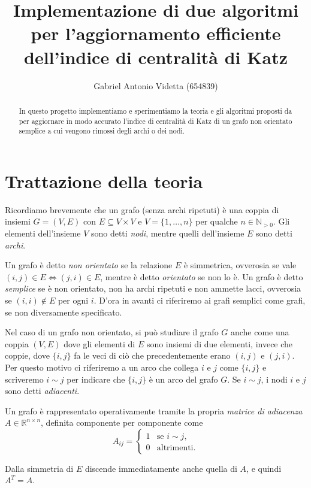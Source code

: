 \documentclass[a4paper]{article}
\title{Implementazione di due algoritmi per l'aggiornamento efficiente dell'indice di centralità di Katz}
\author{Gabriel Antonio Videtta (\textsc{654839})}
\newcommand{\NNp}{\mathbb{N}_{> 0}}
\newcommand{\RR}{\mathbb{R}}
\newcommand{\se}{\text{se }}
\newcommand{\altrimenti}{\text{altrimenti}}
\begin{document}
\maketitle

\begin{abstract}
	In questo progetto implementiamo e sperimentiamo la teoria e gli algoritmi
	proposti da \cite{katz2024} per aggiornare in modo accurato l'indice di
	centralità di Katz di un grafo non orientato semplice a cui vengono rimossi degli archi o dei nodi.
\end{abstract}

\section{Trattazione della teoria}

Ricordiamo brevemente che un grafo (senza archi ripetuti) è una coppia di insiemi $G = (V, E)$ con
$E \subseteq V \times V$ e $V = \{1, \ldots, n\}$ per qualche $n \in \NNp$. Gli elementi dell'insieme $V$ sono detti \textit{nodi}, mentre quelli dell'insieme $E$ sono detti \textit{archi}.

Un grafo è detto \textit{non
	orientato} se la relazione $E$ è simmetrica, ovverosia se vale $(i, j) \in E \iff (j, i) \in E$, mentre è detto \textit{orientato} se non lo è. Un grafo è detto \textit{semplice} se è non orientato, non ha archi ripetuti e non ammette lacci, ovverosia se $(i, i) \notin E$ per ogni $i$. D'ora in
avanti ci riferiremo ai grafi semplici come grafi, se non diversamente
specificato.

Nel caso di un
grafo non orientato, si può studiare il grafo $G$ anche come una coppia
$(V, E)$ dove gli elementi di $E$ sono insiemi di due elementi, invece che
coppie, dove $\{i, j\}$ fa le veci di ciò che precedentemente erano
$(i, j)$ e $(j, i)$. Per questo motivo ci riferiremo a un arco che collega
$i$ e $j$ come $\{i, j\}$ e scriveremo $i \sim j$ per indicare che $\{i, j\}$ è un arco del grafo $G$. Se $i \sim j$, i nodi $i$ e $j$ sono
detti \textit{adiacenti}.

Un grafo è rappresentato operativamente tramite la propria \textit{matrice
	di adiacenza} $A \in \RR^{n \times n}$, definita componente per componente come
\[
	A_{ij} = \begin{cases}
	1 & \se i \sim j, \\
	0 & \altrimenti.
	\end{cases}
\]

Dalla simmetria di $E$ discende immediatamente anche quella di $A$, e quindi
$A^T = A$.
\end{document}
